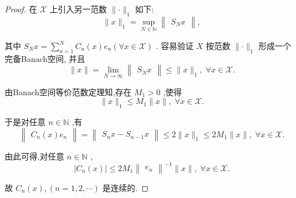 \documentclass[lang=cn,newtx,10pt,scheme=chinese,thmcnt=chapter]{elegantbook}
\begin{document}
\begin{proof}
    在 \(\mathcal{X}\) 上引入另一范数 \(\parallel  \cdot  {\parallel }_{1}\) 如下:
\begin{equation*}
\parallel x{\parallel }_{1} = \mathop{\sup }\limits_{{N \in  \mathbb{N}}}\begin{Vmatrix}{{S}_{N}x}\end{Vmatrix},
\end{equation*}

其中 \({S}_{N}x = \mathop{\sum }\limits_{{n = 1}}^{N}{C}_{n}\left( x\right) {e}_{n}\left( {\forall x \in  \mathcal{X}}\right)\) . 容易验证 \(X\) 按范数 \(\parallel  \cdot  {\parallel }_{1}\) 形成一个完备Banach空间, 并且
\begin{equation*}
\parallel x\parallel  = \mathop{\lim }\limits_{{N \rightarrow  \infty }}\begin{Vmatrix}{{S}_{N}x}\end{Vmatrix} \leqslant  \parallel x{\parallel }_{1},\;\forall x \in  \mathcal{X}.
\end{equation*}

由Banach空间等价范数定理知,存在 \({M}_{1} > 0\) ,使得
\begin{equation*}
\parallel x{\parallel }_{1} \leqslant  {M}_{1}\parallel x\parallel ,\;\forall x \in  \mathcal{X}.
\end{equation*}

于是对任意 \(n \in  \mathbb{N}\) ,有
\begin{equation*}
\begin{Vmatrix}{{C}_{n}\left( x\right) {e}_{n}}\end{Vmatrix} = \begin{Vmatrix}{{S}_{n}x - {S}_{n - 1}x}\end{Vmatrix} \leqslant  2\parallel x{\parallel }_{1} \leqslant  2{M}_{1}\parallel x\parallel ,\;\forall x \in  \mathcal{X}.
\end{equation*}

由此可得,对任意 \(n \in  \mathbb{N}\) ,
\begin{equation*}
\left| {{C}_{n}\left( x\right) }\right|  \leqslant  2{M}_{1}{\begin{Vmatrix}{e}_{n}\end{Vmatrix}}^{-1}\parallel x\parallel ,\;\forall x \in  \mathcal{X}.
\end{equation*}

故 \({C}_{n}\left( x\right) ,\left( {n = 1,2,\cdots }\right)\) 是连续的.

\end{proof}
\end{document}
